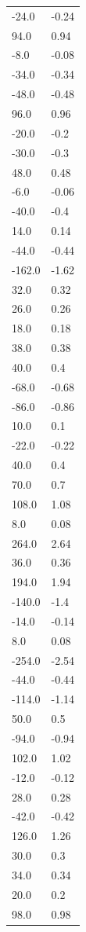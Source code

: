 \begin{longtable}{ll}
-24.0 & -0.24 \\
94.0 & 0.94 \\
-8.0 & -0.08 \\
-34.0 & -0.34 \\
-48.0 & -0.48 \\
96.0 & 0.96 \\
-20.0 & -0.2 \\
-30.0 & -0.3 \\
48.0 & 0.48 \\
-6.0 & -0.06 \\
-40.0 & -0.4 \\
14.0 & 0.14 \\
-44.0 & -0.44 \\
-162.0 & -1.62 \\
32.0 & 0.32 \\
26.0 & 0.26 \\
18.0 & 0.18 \\
38.0 & 0.38 \\
40.0 & 0.4 \\
-68.0 & -0.68 \\
-86.0 & -0.86 \\
10.0 & 0.1 \\
-22.0 & -0.22 \\
40.0 & 0.4 \\
70.0 & 0.7 \\
108.0 & 1.08 \\
8.0 & 0.08 \\
264.0 & 2.64 \\
36.0 & 0.36 \\
194.0 & 1.94 \\
-140.0 & -1.4 \\
-14.0 & -0.14 \\
8.0 & 0.08 \\
-254.0 & -2.54 \\
-44.0 & -0.44 \\
-114.0 & -1.14 \\
50.0 & 0.5 \\
-94.0 & -0.94 \\
102.0 & 1.02 \\
-12.0 & -0.12 \\
28.0 & 0.28 \\
-42.0 & -0.42 \\
126.0 & 1.26 \\
30.0 & 0.3 \\
34.0 & 0.34 \\
20.0 & 0.2 \\
98.0 & 0.98 \\

\end{longtable}
